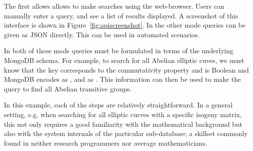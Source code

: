 The first allows allows to make searches using the web-browser.  Users can manually enter
a query, and see a list of results displayed.  A screenshot of this interface is shown in
Figure~\ref{fig:apiscreenshot}.  In the other mode queries can be given as JSON
directly.  This can be used in automated scenarios.

In both of these mods queries must be formulated in terms of the underlying MongoDB
schema. For example, to search for all Abelian elliptic cuves, we must know that the
 key
corresponds to the commutativity property and is Boolean and MongoDB encodes
 as , and  as . This
information can then be used to make the query  to find all Abelian
transitive groups.

In this example, each of the steps are relatively straightforward. 
In a general setting, e.g. when searching for all elliptic curves with a specific isogeny
matrix, this not only requires a good familiarity with the mathematical background but
also with the system internals of the particular \lmfdb sub-database; a skillset commonly
found in neither research programmers nor average mathematicians.   


